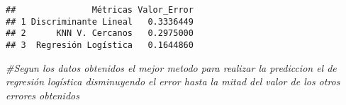 \documentclass[
]{article}
\newenvironment{Shaded}{\begin{snugshade}}{\end{snugshade}}
\newcommand{\CommentTok}[1]{\textcolor[rgb]{0.56,0.35,0.01}{\textit{#1}}}
\begin{document}
\begin{verbatim}
##               Métricas Valor_Error
## 1 Discriminante Lineal   0.3336449
## 2      KNN V. Cercanos   0.2975000
## 3  Regresión Logística   0.1644860
\end{verbatim}

\begin{Shaded}
\begin{Highlighting}[]
\CommentTok{\#Segun los datos obtenidos el mejor metodo para realizar la prediccion el de regresión logística disminuyendo el error hasta la mitad del valor de los otros errores obtenidos }
\end{Highlighting}
\end{Shaded}
\end{document}
